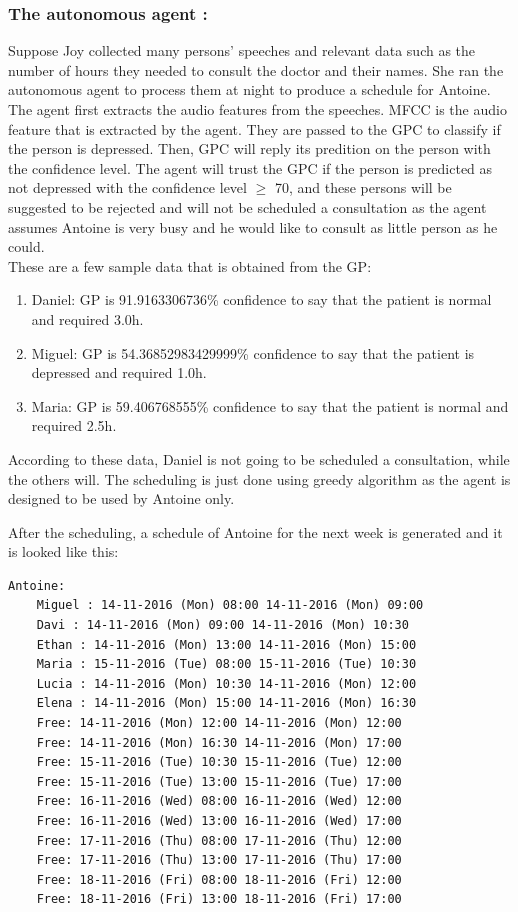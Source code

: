 \documentclass{article}
\begin{document}
	\subsubsection{The autonomous agent :}
	Suppose Joy collected many persons' speeches and relevant data such as the number of hours they needed to consult the doctor and their names. 
	She ran the autonomous agent to process them at night to produce a schedule for Antoine.
	The agent first extracts the audio features from the speeches.
	MFCC is the audio feature that is extracted by the agent. They are passed to the GPC to classify if the person is depressed. 
	Then, GPC will reply its predition on the person with the confidence level.
	The agent will trust the GPC if the person is predicted as not depressed with the confidence level \(\geq\) 70,
	and these persons will be suggested to be rejected and will not be scheduled a consultation as the agent assumes Antoine is very busy and 
	he would like to consult as little person as he could. \\

	These are a few sample data that is obtained from the GP:
	\begin{enumerate}
     	\item Daniel: GP is 91.9163306736\% confidence to say that the patient is normal and required 3.0h.
		\item Miguel: GP is 54.36852983429999\% confidence to say that the patient is depressed and required 1.0h.
		\item Maria: GP is 59.406768555\% confidence to say that the patient is normal and required 2.5h.
     	\end{enumerate}

	According to these data, Daniel is not going to be scheduled a consultation, while the others will.
	The scheduling is just done using greedy algorithm as the agent is designed to be used by Antoine only.

	After the scheduling, a schedule of Antoine for the next week is generated and it is looked like this:
	\begin{Verbatim}[fontsize=\tiny]
	Antoine:
	Miguel : 14-11-2016 (Mon) 08:00 14-11-2016 (Mon) 09:00
	Davi : 14-11-2016 (Mon) 09:00 14-11-2016 (Mon) 10:30
	Ethan : 14-11-2016 (Mon) 13:00 14-11-2016 (Mon) 15:00
	Maria : 15-11-2016 (Tue) 08:00 15-11-2016 (Tue) 10:30
	Lucia : 14-11-2016 (Mon) 10:30 14-11-2016 (Mon) 12:00
	Elena : 14-11-2016 (Mon) 15:00 14-11-2016 (Mon) 16:30
	Free: 14-11-2016 (Mon) 12:00 14-11-2016 (Mon) 12:00
	Free: 14-11-2016 (Mon) 16:30 14-11-2016 (Mon) 17:00
	Free: 15-11-2016 (Tue) 10:30 15-11-2016 (Tue) 12:00
	Free: 15-11-2016 (Tue) 13:00 15-11-2016 (Tue) 17:00
	Free: 16-11-2016 (Wed) 08:00 16-11-2016 (Wed) 12:00
	Free: 16-11-2016 (Wed) 13:00 16-11-2016 (Wed) 17:00
	Free: 17-11-2016 (Thu) 08:00 17-11-2016 (Thu) 12:00
	Free: 17-11-2016 (Thu) 13:00 17-11-2016 (Thu) 17:00
	Free: 18-11-2016 (Fri) 08:00 18-11-2016 (Fri) 12:00
	Free: 18-11-2016 (Fri) 13:00 18-11-2016 (Fri) 17:00
	\end{Verbatim}
\end{document}
